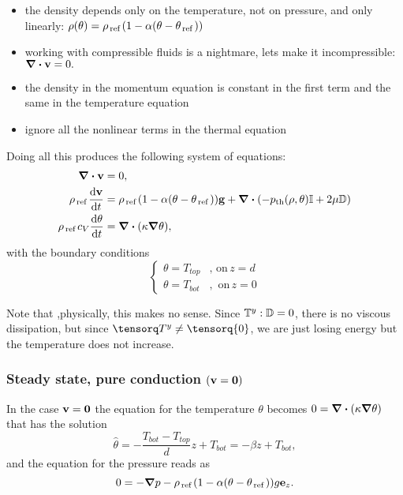 \documentclass[reqno, a4paper]{article}
\begin{document}
\begin{itemize}
	\item the density depends only on the temperature, not on pressure, and only linearly: $\rho(\theta) = \rho_{\, \text{ref} \,}\qty(1- \alpha\qty(\theta - \theta_{\, \text{ref} \,}))$
	\item working with compressible fluids is a nightmare, lets make it incompressible: $\divergence{\vb{v}} = 0.$
	\item the density in the momentum equation is constant in the first term and the same in the temperature equation
	\item ignore all the nonlinear terms in the thermal equation
\end{itemize}
Doing all this produces the following system of equations:
\begin{align*}
	\divergence{\vb{v}} &= 0, \\
	\rho_{\, \text{ref} \,} \dv{\vb{v}}{t} &= \rho_{\, \text{ref} \,}\qty(1- \alpha\qty(\theta-\theta_{\, \text{ref} \,})) \vb{g} + \divergence{\qty(-\pth\qty(\rho, \theta)\identity +  2 \mu \symvgrad)} \\
	\rho_{\, \text{ref} \,} c_{V}\dv{\theta}{t} &= \divergence{\qty(\kappa \grad \theta)},
	\end{align*}
with the boundary conditions
\[
	\begin{cases}
		\theta = T_{top}&, \, \text{on} \, z=d \\
		\theta = T_{bot}&, \, \, \text{on} \,z=0
	\end{cases}
	\]

Note that ,physically, this makes no sense. Since $\mathbb{T}^y : \mathbb{D} = 0$, there is no viscous dissipation, but since $\cstress \neq \tensorq{0}$, we are just losing energy but the temperature does not increase.

\subsubsection{Steady state, pure conduction $\qty(\vb{v} = \vb{0})$}
\label{sec:steady_state}
In the case $\vb{v} = \vb{0}$ the equation for the temperature $\theta$ becomes $0 = \divergence{\qty(\kappa \grad \theta)}$ that has the solution
\[
	\hat{\theta} = - \frac{T_{bot}-T_{top}}{d}z + T_{bot} = -\beta z + T_{bot},
\]
and the equation for the pressure reads as
\[
	0 = - \grad p - \rho_{\, \text{ref} \,}\qty(1-\alpha\qty(\theta - \theta_{\, \text{ref} \,}))g \vb{e}_{z}.
\]
\end{document}

